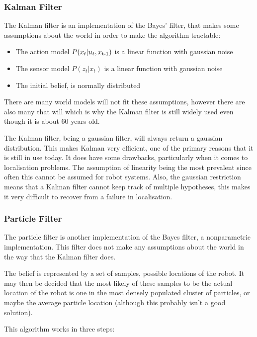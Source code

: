 \subsubsection{Kalman Filter}

The Kalman filter is an implementation of the Bayes’ filter, that makes some assumptions about the world in order to make the algorithm tractable:
\begin{itemize}
\item The action model $P(x_t|u_t,x\textsubscript{t-1})$ is a linear function with gaussian noise
\item The sensor model $P(z_t|x_t)$ is a linear function with gaussian noise
\item The initial belief, is normally distributed
\end{itemize}

There are many world models will not fit these assumptions, however there are also many that will which is why the Kalman filter is still widely used even though it is about 60 years old. \parencite{Thrun:2005:PR:1121596} 

The Kalman filter, being a gaussian filter, will always return a gaussian distribution. This makes Kalman very efficient, one of the primary reasons that it is still in use today. It does have some drawbacks, particularly when it comes to localisation problems. The assumption of linearity being the most prevalent since often this cannot be assumed for robot systems. Also, the gaussian restriction means that a Kalman filter cannot keep track of multiple hypotheses, this makes it very difficult to recover from a failure in localisation.

\subsubsection{Particle Filter}

The particle filter is another implementation of the Bayes filter, a nonparametric implementation. This filter does not make any assumptions about the world in the way that the Kalman filter does.

The belief is represented by a set of samples, possible locations of the robot. It may then be decided that the most likely of these samples to be the actual location of the robot is one in the most densely populated cluster of particles, or maybe the average particle location (although this probably isn’t a good solution).

This algorithm works in three steps:

